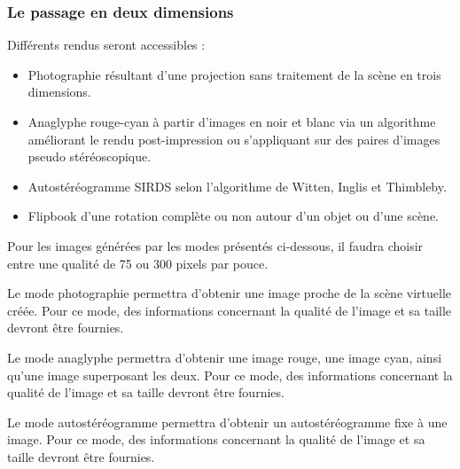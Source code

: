 \subsubsection{Le passage en deux dimensions}
\begin{description}[style=nextline]
	\item[Mode de passage en deux dimensions]
	Différents rendus seront accessibles : 
	\begin{itemize}
			\item Photographie résultant d'une projection sans traitement de la scène en trois dimensions.
			\item Anaglyphe rouge-cyan à partir d'images en noir et blanc via un algorithme améliorant le rendu post-impression ou s’appliquant sur des paires d’images pseudo stéréoscopique.
                        \item Autostéréogramme SIRDS selon l'algorithme de Witten, Inglis et Thimbleby.
                        \item Flipbook d'une rotation complète ou non autour d'un objet ou d'une scène.
	\end{itemize}
	Pour les images générées par les modes présentés ci-dessous, il faudra choisir entre une qualité de 75 ou 300 pixels par pouce. 
	
	\item[Mode photographie]
	\mbox{\hspace{1cm}} Le mode photographie permettra d’obtenir une image proche de la scène virtuelle créée. Pour ce mode, des informations concernant la qualité de l’image et sa taille devront être fournies.
	
	\item[Mode analgyphe]	
	\mbox{\hspace{1cm}}Le mode anaglyphe permettra d’obtenir une image rouge, une image cyan, ainsi qu’une image superposant les deux. Pour ce mode, des informations concernant la qualité de l’image et sa taille devront être fournies.
	
	\item[Mode autostéréogramme]	
	\mbox{\hspace{1cm}}Le mode autostéréogramme permettra d’obtenir un autostéréogramme fixe à une image. Pour ce mode, des informations concernant la qualité de l’image et sa taille devront être fournies.
	

\end{description}

